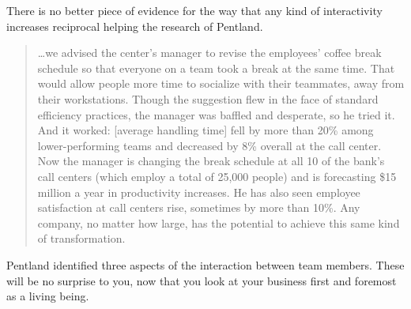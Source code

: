 There is no better piece of evidence for the way that any kind of interactivity increases reciprocal helping the research of Pentland\cite{pentland-new-science-great-teams, pentland-hard-science-teamwork}.


\begin{quote}
\ldots we advised the center’s manager to revise the employees’ coffee break schedule so that everyone on a team took a break at the same time. That would allow people more time to socialize with their teammates, away from their workstations. Though the suggestion flew in the face of standard efficiency practices, the manager was baffled and desperate, so he tried it. And it worked: [average handling time] fell by more than 20\% among lower-performing teams and decreased by 8\% overall at the call center. Now the manager is changing the break schedule at all 10 of the bank’s call centers (which employ a total of 25,000 people) and is forecasting \$15 million a year in productivity increases. He has also seen employee satisfaction at call centers rise, sometimes by more than 10\%. Any company, no matter how large, has the potential to achieve this same kind of transformation.
\end{quote}


Pentland identified three aspects of the interaction between team members. These will be no surprise to you, now that you look at your business first and foremost as a living being.


